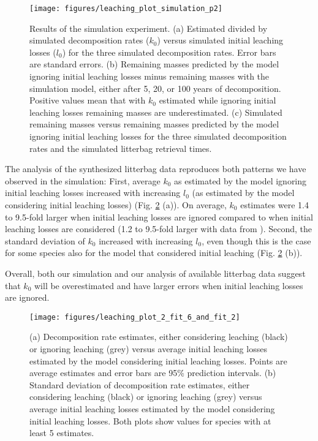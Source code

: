 \documentclass[bg, manuscript]{copernicus}
\begin{document}
\begin{figure}[H]

{\centering \texttt{[image: figures/leaching\_plot\_simulation\_p2]} 

}

\caption{Results of the simulation experiment. (a) Estimated divided by simulated decomposition rates (\(k_0\)) versus simulated initial leaching losses (\(l_0\)) for the three simulated decomposition rates. Error bars are standard errors. (b) Remaining masses predicted by the model ignoring initial leaching losses minus remaining masses with the simulation model, either after 5, 20, or 100 years of decomposition. Positive values mean that with \(k_0\) estimated while ignoring initial leaching losses remaining masses are underestimated. (c) Simulated remaining masses versus remaining masses predicted by the model ignoring initial leaching losses for the three simulated decomposition rates and the simulated litterbag retrieval times.}\label{fig:out-p-simulation-p2}
\end{figure}

The analysis of the synthesized litterbag data reproduces both patterns we have observed in the simulation: First, average \(k_0\) as estimated by the model ignoring initial leaching losses increased with increasing \(l_0\) (as estimated by the model considering initial leaching losses) (Fig. \ref{fig:out-mm27-1-mm28-1-p2} (a)). On average, \(k_0\) estimates were 1.4 to 9.5-fold larger when initial leaching losses are ignored compared to when initial leaching losses are considered (1.2 to 9.5-fold larger with data from \citet{Bengtsson.2017}). Second, the standard deviation of \(k_0\) increased with increasing \(l_0\), even though this is the case for some species also for the model that considered initial leaching (Fig. \ref{fig:out-mm27-1-mm28-1-p2} (b)).

Overall, both our simulation and our analysis of available litterbag data suggest that \(k_0\) will be overestimated and have larger errors when initial leaching losses are ignored.



\begin{figure}[H]

{\centering \texttt{[image: figures/leaching\_plot\_2\_fit\_6\_and\_fit\_2]} 

}

\caption{(a) Decomposition rate estimates, either considering leaching (black) or ignoring leaching (grey) versus average initial leaching losses estimated by the model considering initial leaching losses. Points are average estimates and error bars are 95\% prediction intervals. (b) Standard deviation of decomposition rate estimates, either considering leaching (black) or ignoring leaching (grey) versus average initial leaching losses estimated by the model considering initial leaching losses. Both plots show values for species with at least 5 estimates.}\label{fig:out-mm27-1-mm28-1-p2}
\end{figure}
\end{document}
